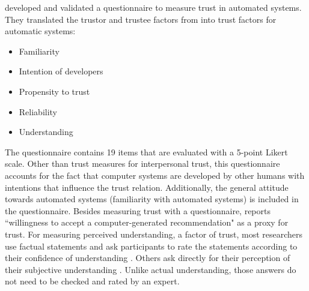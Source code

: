 \cite{korber2018theoretical} developed and validated a questionnaire to measure trust in automated systems. They translated the trustor and trustee factors from \cite{mayer1995integrative} into trust factors for automatic systems:
\begin{itemize}
	\item Familiarity
	\item Intention of developers
	\item Propensity to trust
	\item Reliability
	\item Understanding
\end{itemize}
The questionnaire contains 19 items that are evaluated with a 5-point Likert scale. Other than trust measures for interpersonal trust, this questionnaire accounts for the fact that computer systems are developed by other humans with intentions that influence the trust relation. Additionally, the general attitude towards automated systems (familiarity with automated systems) is included in the questionnaire.\newline
Besides measuring trust with a questionnaire, \cite{vorm2018assessing} reports ``willingness to accept a computer-generated recommendation" as a proxy for trust.\newline
For measuring perceived understanding, a factor of trust, most researchers use factual statements and ask participants to rate the statements according to their confidence of understanding \cite{ball2015development, broadbent2006brief}. Others ask directly for their perception of their subjective understanding \cite{joffe2001quality, racine2018participants, van2001perceived, zamalia2016students}. Unlike actual understanding, those answers do not need to be checked and rated by an expert.






